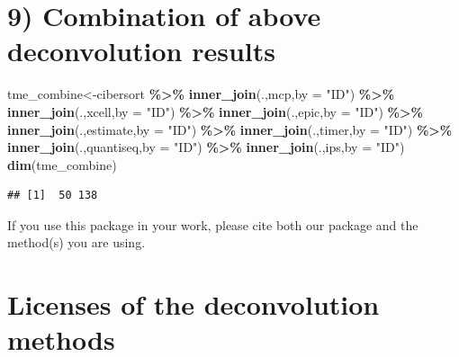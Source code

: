 \documentclass[
  12pt,
]{book}
\newenvironment{Shaded}{\begin{snugshade}}{\end{snugshade}}
\newcommand{\AttributeTok}[1]{\textcolor[rgb]{0.13,0.29,0.53}{#1}}
\newcommand{\FunctionTok}[1]{\textcolor[rgb]{0.13,0.29,0.53}{\textbf{#1}}}
\newcommand{\NormalTok}[1]{#1}
\newcommand{\OtherTok}[1]{\textcolor[rgb]{0.56,0.35,0.01}{#1}}
\newcommand{\SpecialCharTok}[1]{\textcolor[rgb]{0.81,0.36,0.00}{\textbf{#1}}}
\newcommand{\StringTok}[1]{\textcolor[rgb]{0.31,0.60,0.02}{#1}}
\theoremstyle{definition}
\theoremstyle{definition}
\theoremstyle{definition}
\theoremstyle{definition}
\theoremstyle{remark}
\begin{document}
\hypertarget{combination-of-above-deconvolution-results}{%
\section{9) Combination of above deconvolution results}\label{combination-of-above-deconvolution-results}}

\begin{Shaded}
\begin{Highlighting}[]
\NormalTok{tme\_combine}\OtherTok{\textless{}{-}}\NormalTok{cibersort }\SpecialCharTok{\%\textgreater{}\%} 
  \FunctionTok{inner\_join}\NormalTok{(.,mcp,}\AttributeTok{by       =} \StringTok{"ID"}\NormalTok{) }\SpecialCharTok{\%\textgreater{}\%} 
  \FunctionTok{inner\_join}\NormalTok{(.,xcell,}\AttributeTok{by     =} \StringTok{"ID"}\NormalTok{) }\SpecialCharTok{\%\textgreater{}\%}
  \FunctionTok{inner\_join}\NormalTok{(.,epic,}\AttributeTok{by      =} \StringTok{"ID"}\NormalTok{) }\SpecialCharTok{\%\textgreater{}\%} 
  \FunctionTok{inner\_join}\NormalTok{(.,estimate,}\AttributeTok{by  =} \StringTok{"ID"}\NormalTok{) }\SpecialCharTok{\%\textgreater{}\%} 
  \FunctionTok{inner\_join}\NormalTok{(.,timer,}\AttributeTok{by     =} \StringTok{"ID"}\NormalTok{) }\SpecialCharTok{\%\textgreater{}\%} 
  \FunctionTok{inner\_join}\NormalTok{(.,quantiseq,}\AttributeTok{by =} \StringTok{"ID"}\NormalTok{) }\SpecialCharTok{\%\textgreater{}\%} 
  \FunctionTok{inner\_join}\NormalTok{(.,ips,}\AttributeTok{by       =} \StringTok{"ID"}\NormalTok{)}
\FunctionTok{dim}\NormalTok{(tme\_combine)}
\end{Highlighting}
\end{Shaded}

\begin{verbatim}
## [1]  50 138
\end{verbatim}

If you use this package in your work, please cite both our package and the method(s) you are using.

\hypertarget{licenses-of-the-deconvolution-methods}{%
\section{Licenses of the deconvolution methods}\label{licenses-of-the-deconvolution-methods}}
\end{document}
